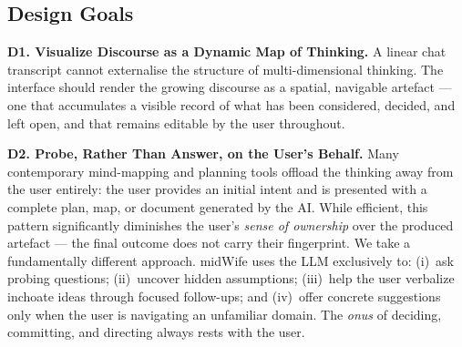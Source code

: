 \documentclass[sigconf]{acmart}
\begin{document}
\subsection{Design Goals}
\textbf{D1. Visualize Discourse as a Dynamic Map of Thinking.}
A linear chat transcript cannot externalise the structure of multi-dimensional thinking.
The interface should render the growing discourse as a spatial, navigable artefact ---
one that accumulates a visible record of what has been considered, decided, and left
open, and that remains editable by the user throughout.

\textbf{D2. Probe, Rather Than Answer, on the User's Behalf.}
Many contemporary mind-mapping and planning tools offload the thinking away from the
user entirely: the user provides an initial intent and is presented with a complete
plan, map, or document generated by the AI. While efficient, this pattern significantly
diminishes the user's \textit{sense of ownership} over the produced artefact --- the
final outcome does not carry their fingerprint. We take a fundamentally different
approach. midWife uses the LLM exclusively to: (i)~ask probing questions; (ii)~uncover
hidden assumptions; (iii)~help the user verbalize inchoate ideas through focused
follow-ups; and (iv)~offer concrete suggestions only when the user is navigating an
unfamiliar domain. The \textit{onus} of deciding, committing, and directing always rests with the user.
\end{document}
